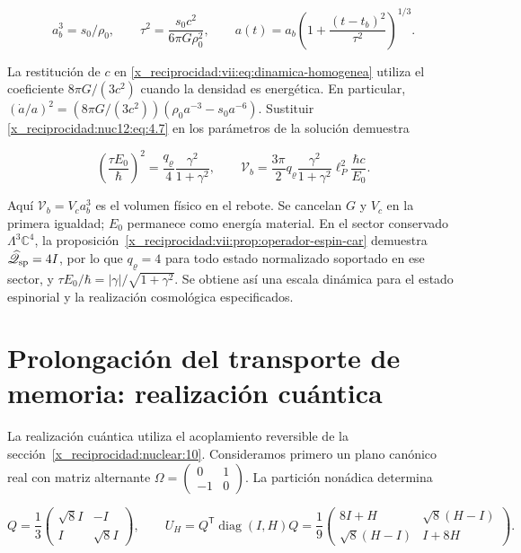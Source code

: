 \[
a_b^3=s_0/\rho_0,\qquad
\tau^2=\frac{s_0c^2}{6\pi G\rho_0^2},\qquad
a(t)=a_b\left(1+\frac{(t-t_b)^2}{\tau^2}\right)^{1/3}.
\]



La restitución de \(c\) en \eqref{x_reciprocidad:vii:eq:dinamica-homogenea} utiliza el coeficiente \(8\pi G/(3c^2)\) cuando la densidad es energética. En particular, \((\dot a/a)^2=(8\pi G/(3c^2))(\rho_0a^{-3}-s_0a^{-6})\). Sustituir \eqref{x_reciprocidad:nuc12:eq:4.7} en los parámetros de la solución demuestra



\begin{equation}
\boxed{\left(\frac{\tau E_0}{\hbar}\right)^2
=\frac{q_\varrho}{4}\frac{\gamma^2}{1+\gamma^2},\qquad
\mathcal V_b=\frac{3\pi}{2}q_\varrho
\frac{\gamma^2}{1+\gamma^2}\ell_P^2\frac{\hbar c}{E_0}.}
\label{x_reciprocidad:nuc12:eq:4.8}
\end{equation}



Aquí \(\mathcal V_b=V_c a_b^3\) es el volumen físico en el rebote. Se cancelan \(G\) y \(V_c\) en la primera igualdad; \(E_0\) permanece como energía material. En el sector conservado \(\Lambda^3\mathbb C^4\), la proposición~\ref{x_reciprocidad:vii:prop:operador-espin-car} demuestra \(\widehat{\mathscr Q}_{\rm sp}=4I\), por lo que \(q_\varrho=4\) para todo estado normalizado soportado en ese sector, y
\(\tau E_0/\hbar=|\gamma|/\sqrt{1+\gamma^2}\).
Se obtiene así una escala dinámica para el estado espinorial y la realización cosmológica especificados.

\section{Prolongación del transporte de memoria: realización cuántica}

La realización cuántica utiliza el acoplamiento reversible de la sección~\ref{x_reciprocidad:nuclear:10}. Consideramos primero un plano canónico real con matriz alternante \(\Omega=\left(\begin{smallmatrix}0&1\\-1&0\end{smallmatrix}\right)\). La partición nonádica determina



\begin{equation}
Q=\frac13\begin{pmatrix}\sqrt8 I&-I\\I&\sqrt8 I\end{pmatrix},\qquad
U_H=Q^{\mathsf T}\operatorname{diag}(I,H)Q
=\frac19\begin{pmatrix}8I+H&\sqrt8(H-I)\\
\sqrt8(H-I)&I+8H\end{pmatrix}.
\label{x_reciprocidad:nuc12:eq:5.1}
\end{equation}



